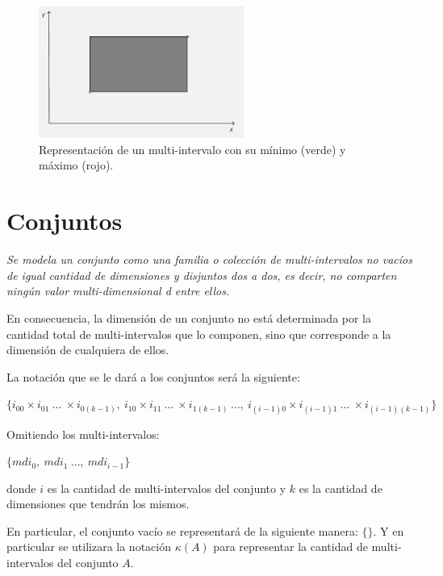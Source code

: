 \begin{figure}[ht]
  \centering
  \includegraphics[width=0.6\textwidth]{figures/Conceptos previos/Multi-intervalos/minmax.png}
  \caption{Representación de un multi-intervalo con su mínimo (verde) y máximo (rojo).}
  \label{fig:multi}
\end{figure}


\section{Conjuntos}

\begin{center}
    \textit{Se modela un conjunto como una familia o colección de multi-intervalos no vacíos de igual cantidad de dimensiones y disjuntos dos a dos, es decir, no comparten ningún valor multi-dimensional d entre ellos.}
\end{center}

En consecuencia, la dimensión de un conjunto no está determinada por la cantidad total de multi-intervalos que lo componen, sino que corresponde a la dimensión de cualquiera de ellos.

La notación que se le dará a los conjuntos será la siguiente:

\begin{center}


    $\{i_{00} \times i_{01} \ \ldots \ \times i_{0(k-1)},\ i_{10} \times i_{11} \ \ldots \ \times i_{1(k-1)}\, \ldots,\ i_{(i-1)0} \times i_{(i-1)1} \ \ldots \ \times i_{(i-1)(k-1)}\}$
    
    Omitiendo los multi-intervalos:
    
    $\{mdi_0,\ mdi_1\ \ldots,\ mdi_{i-1}\}$

    donde $i$ es la cantidad de multi-intervalos del conjunto y $k$ es la cantidad de dimensiones que tendrán los mismos.
\end{center}

En particular, el conjunto vacío se representará de la siguiente manera: $\{\}$. Y en particular se utilizara la notación $\kappa(A)$ para representar la cantidad de multi-intervalos del conjunto $A$.


